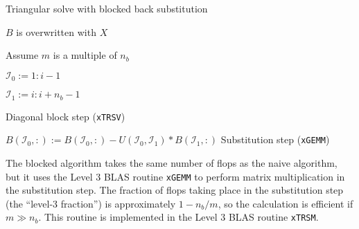\documentclass{article}
\begin{document}
\begin{algorithm}[H]
  \label{algorithm:trsm}
  \caption{Triangular solve with blocked back substitution}
  \begin{algorithmic}
    \Comment \(B\) is overwritten with \(X\)

     \Comment Assume \(m\) is a multiple of
    \(n_b\)

    \State \( \mathcal{I}_0 := 1:i-1 \)

    \State \( \mathcal{I}_1 := i:i+n_b-1\)
    

    \State {} 
    \Comment Diagonal block step (\texttt{xTRSV})

    \EndFor

    \State \( B(\mathcal{I}_0,:) := B(\mathcal{I}_0,:) - U(\mathcal{I}_0,\mathcal{I}_1) * B(\mathcal{I}_1,:) \)
    \Comment Substitution step (\texttt{xGEMM})

    \EndFor

    \EndProcedure
  \end{algorithmic}
\end{algorithm}
\noindent
The blocked algorithm takes the same number of flops as the naive
algorithm, but it uses the Level 3 BLAS routine \texttt{xGEMM} to
perform matrix multiplication in the substitution step.  The fraction
of flops taking place in the substitution step (the ``level-3
fraction'') is approximately \(1-n_b/m\), so the calculation is
efficient if \(m\gg n_b\). This routine is implemented in the Level 3
BLAS routine \texttt{xTRSM}.
\end{document}
